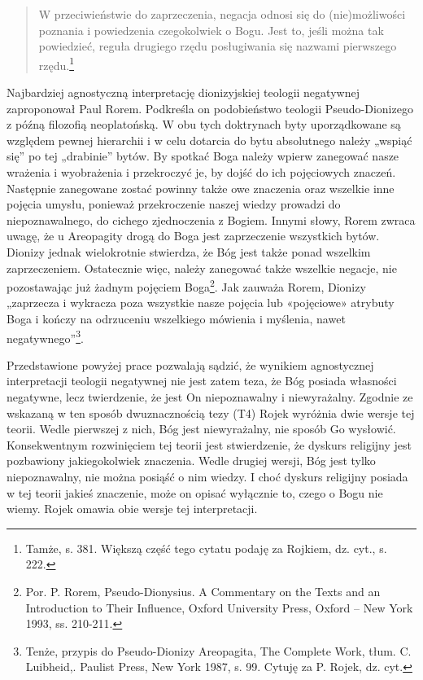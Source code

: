 \begin{quote}
        W przeciwieństwie do zaprzeczenia, negacja odnosi się do (nie)możliwości
poznania i powiedzenia czegokolwiek o Bogu. Jest to, jeśli można tak
powiedzieć, reguła drugiego rzędu posługiwania się nazwami pierwszego
rzędu.\footnote{Tamże, s. 381. Większą część tego cytatu podaję za
Rojkiem, dz. cyt., s. 222. }
\end{quote}






Najbardziej agnostyczną interpretację dionizyjskiej teologii negatywnej
zaproponował Paul Rorem. Podkreśla on podobieństwo teologii
Pseudo-Dionizego z późną filozofią neoplatońską. W obu tych doktrynach
byty uporządkowane są względem pewnej hierarchii i w celu dotarcia do
bytu absolutnego należy „wspiąć się” po tej „drabinie” bytów. By
spotkać Boga należy wpierw zanegować nasze wrażenia i wyobrażenia i
przekroczyć je, by dojść do ich pojęciowych znaczeń. Następnie
zanegowane zostać powinny także owe znaczenia oraz wszelkie inne
pojęcia umysłu, ponieważ przekroczenie naszej wiedzy prowadzi do
niepoznawalnego, do cichego zjednoczenia z Bogiem. Innymi słowy, Rorem
zwraca uwagę, że u Areopagity drogą do Boga jest zaprzeczenie
wszystkich bytów. Dionizy jednak wielokrotnie stwierdza, że Bóg jest
także ponad wszelkim zaprzeczeniem. Ostatecznie więc, należy zanegować
także wszelkie negacje, nie pozostawając już żadnym pojęciem
Boga\footnote{Por. P. Rorem, Pseudo-Dionysius. A Commentary on the
Texts and an Introduction to Their Influence, Oxford University Press,
Oxford -- New York 1993, ss. 210-211. }. Jak zauważa Rorem, Dionizy
„zaprzecza i wykracza poza wszystkie nasze pojęcia lub «pojęciowe»
atrybuty Boga i kończy na odrzuceniu wszelkiego mówienia i myślenia,
nawet negatywnego”\footnote{Tenże, przypis do Pseudo-Dionizy
Areopagita, The Complete Work, tłum. C. Luibheid,. Paulist Press, New
York 1987, s. 99. Cytuję za P. Rojek, dz. cyt. }.

Przedstawione powyżej prace pozwalają sądzić, że wynikiem agnostycznej
interpretacji teologii negatywnej nie jest zatem teza, że Bóg posiada
własności negatywne, lecz twierdzenie, że jest On niepoznawalny i
niewyrażalny. Zgodnie ze wskazaną w ten sposób dwuznacznością tezy (T4)
Rojek wyróżnia dwie wersje tej teorii. Wedle pierwszej z nich, Bóg jest
niewyrażalny, nie sposób Go wysłowić. Konsekwentnym rozwinięciem tej
teorii jest stwierdzenie, że dyskurs religijny jest pozbawiony
jakiegokolwiek znaczenia. Wedle drugiej wersji, Bóg jest tylko
niepoznawalny, nie można posiąść o nim wiedzy. I choć dyskurs religijny
posiada w tej teorii jakieś znaczenie, może on opisać wyłącznie to,
czego o Bogu nie wiemy. Rojek omawia obie wersje tej interpretacji.



